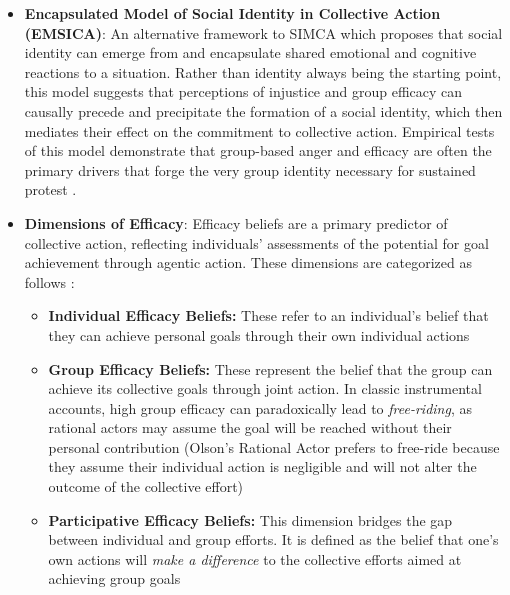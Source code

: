 \documentclass[jou,floatsintext]{apa7}
\begin{document}
\begin{itemize}
\begin{itemize}
\begin{itemize}
    \item[$\rightarrow$] \cite{vanzomerenIntegratingWhoWe2018} proposes extending the core of SIMCA by integrating moral motivations (a broad array of violated moral beliefs such as values, rights, and convictions) with identity content (what it specifically means to be a group member), thereby conceptually and empirically linking who we are with what we stand for through the principle of normative fit \parencite[see also meta-analysis of][]{agostiniComprehensivePotentiallyCrosscultural2021} 
\end{itemize}

\item \textbf{Encapsulated Model of Social Identity in Collective Action (EMSICA)}: An alternative framework to SIMCA which proposes that social identity can emerge from and encapsulate shared emotional and cognitive reactions to a situation. Rather than identity always being the starting point, this model suggests that perceptions of injustice and group efficacy can causally precede and precipitate the formation of a social identity, which then mediates their effect on the commitment to collective action. Empirical tests of this model demonstrate that group-based anger and efficacy are often the primary drivers that forge the very group identity necessary for sustained protest \parencite{thomasSocialIdentitiesFacilitate2012}.

\item \textbf{Dimensions of Efficacy}: Efficacy beliefs are a primary predictor of collective action, reflecting individuals' assessments of the potential for goal achievement through agentic action. These dimensions are categorized as follows \parencite{vanzomerenBelievingMakingDifference2013}:
\begin{itemize}
    \item \textbf{Individual Efficacy Beliefs:} These refer to an individual's belief that they can achieve personal goals through their own individual actions
    \item \textbf{Group Efficacy Beliefs:} These represent the belief that the group can achieve its collective goals through joint action. In classic instrumental accounts, high group efficacy can paradoxically lead to \textit{free-riding}, as rational actors may assume the goal will be reached without their personal contribution (Olson's Rational Actor prefers to free-ride because they assume their individual action is negligible and will not alter the outcome of the collective effort)
    \item \textbf{Participative Efficacy Beliefs:} This dimension bridges the gap between individual and group efforts. It is defined as the belief that one's own actions will \textit{make a difference} to the collective efforts aimed at achieving group goals
\end{itemize}
\end{itemize}


\end{itemize}
\end{document}
